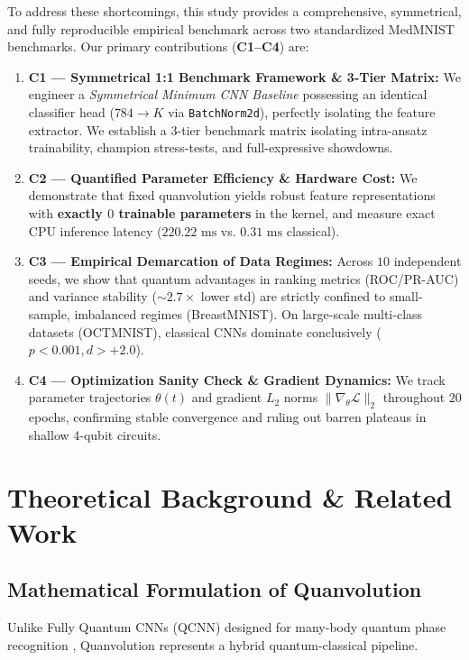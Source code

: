 \documentclass[journal]{IEEEtran}
\begin{document}
To address these shortcomings, this study provides a comprehensive, symmetrical, and fully reproducible empirical benchmark across two standardized MedMNIST benchmarks. Our primary contributions (\textbf{C1--C4}) are:
\begin{enumerate}
    \item \textbf{C1 --- Symmetrical 1:1 Benchmark Framework \& 3-Tier Matrix:} We engineer a \textit{Symmetrical Minimum CNN Baseline} possessing an identical classifier head ($784 \to K$ via \texttt{BatchNorm2d}), perfectly isolating the feature extractor. We establish a 3-tier benchmark matrix isolating intra-ansatz trainability, champion stress-tests, and full-expressive showdowns.
    \item \textbf{C2 --- Quantified Parameter Efficiency \& Hardware Cost:} We demonstrate that fixed quanvolution yields robust feature representations with \textbf{exactly $0$ trainable parameters} in the kernel, and measure exact CPU inference latency ($220.22\text{ ms}$ vs. $0.31\text{ ms}$ classical).
    \item \textbf{C3 --- Empirical Demarcation of Data Regimes:} Across $10$ independent seeds, we show that quantum advantages in ranking metrics (ROC/PR-AUC) and variance stability ($\sim 2.7\times$ lower std) are strictly confined to small-sample, imbalanced regimes (BreastMNIST). On large-scale multi-class datasets (OCTMNIST), classical CNNs dominate conclusively ($p < 0.001, d > +2.0$).
    \item \textbf{C4 --- Optimization Sanity Check \& Gradient Dynamics:} We track parameter trajectories $\theta(t)$ and gradient $L_2$ norms $\|\nabla_\theta \mathcal{L}\|_2$ throughout $20$ epochs, confirming stable convergence and ruling out barren plateaus in shallow 4-qubit circuits.
\end{enumerate}

\section{Theoretical Background \& Related Work}

\subsection{Mathematical Formulation of Quanvolution}
Unlike Fully Quantum CNNs (QCNN) designed for many-body quantum phase recognition \cite{cong2019quantum}, Quanvolution \cite{henderson2020quanvolutional} represents a hybrid quantum-classical pipeline.
\end{document}
